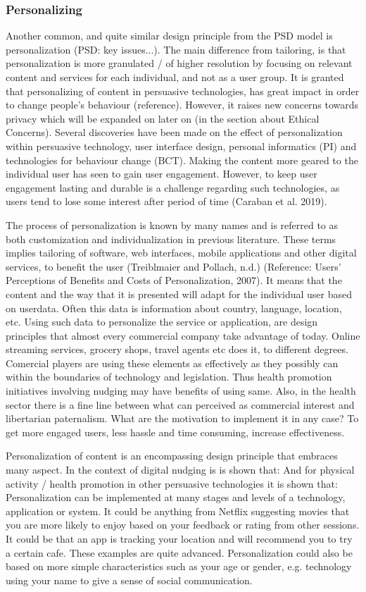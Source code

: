 \subsubsection{Personalizing}
Another common, and quite similar design principle from the PSD model is personalization (PSD: key issues...). 
The main difference from tailoring, is that personalization is more granulated / of higher resolution by focusing on relevant content and services for each individual, and not as a user group. It is granted that personalizing of content in persuasive technologies, has great impact in order to change people's behaviour (reference). However, it raises new concerns towards privacy which will be expanded on later on (in the section about Ethical Concerns). Several discoveries have been made on the effect of personalization within persuasive technology, user interface design, personal informatics (PI) and technologies for behaviour change (BCT). Making the content more geared to the individual user has seen to gain user engagement. However, to keep user engagement lasting and durable is a challenge regarding such technologies, as users tend to lose some interest after period of time (Caraban et al. 2019).

The process of personalization is known by many names and is referred to as both customization and individualization in previous literature. These terms implies tailoring of software, web interfaces, mobile applications and other digital services, to benefit the user (Treiblmaier and Pollach, n.d.) (Reference: Users' Perceptions of Benefits and Costs of Personalization, 2007). It means that the content and the way that it is presented will adapt for the individual user based on userdata. Often this data is information about country, language, location, etc. Using such data to personalize the service or application, are design principles that almost every commercial company take advantage of today. Online streaming services, grocery shops, travel agents etc does it, to different degrees. Comercial players are using these elements as effectively as they possibly can within the boundaries of technology and legislation. Thus health promotion initiatives involving nudging may have benefits of using same. Also, in the health sector there is a fine line between what can perceived as commercial interest and libertarian paternalism. What are the motivation to implement it in any case? To get more engaged users, less hassle and time consuming, increase effectiveness. 

Personalization of content is an encompassing design principle that embraces many aspect. In the context of digital nudging is is shown that: 
And for physical activity / health promotion in other persuasive technologies it is shown that: 
Personalization can be implemented at many stages and levels of a technology, application or system. It could be anything from Netflix suggesting movies that you are more likely to enjoy based on your feedback or rating from other sessions. It could be that an app is tracking your location and will recommend you to try a certain cafe. These examples are quite advanced. Personalization could also be based on more simple characteristics such as your age or gender, e.g. technology using your name to give a sense of social communication. 

